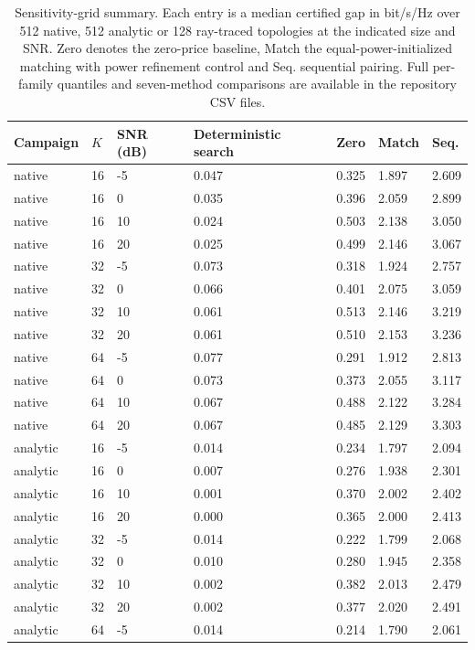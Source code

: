 \begin{table}[htbp]\centering\small
\setlength{\tabcolsep}{3pt}
\caption{Sensitivity-grid summary. Each entry is a median certified gap in bit/s/Hz over 512 native, 512 analytic or 128 ray-traced topologies at the indicated size and SNR. Zero denotes the zero-price baseline, Match the equal-power-initialized matching with power refinement control and Seq. sequential pairing. Full per-family quantiles and seven-method comparisons are available in the repository CSV files.}\label{supp:table5}
\begin{tabular}{lllllll}\toprule
Campaign & $K$ & SNR (dB) & Deterministic search & Zero & Match & Seq.\\\midrule
native & 16 & -5 & 0.047 & 0.325 & 1.897 & 2.609\\
native & 16 & 0 & 0.035 & 0.396 & 2.059 & 2.899\\
native & 16 & 10 & 0.024 & 0.503 & 2.138 & 3.050\\
native & 16 & 20 & 0.025 & 0.499 & 2.146 & 3.067\\
native & 32 & -5 & 0.073 & 0.318 & 1.924 & 2.757\\
native & 32 & 0 & 0.066 & 0.401 & 2.075 & 3.059\\
native & 32 & 10 & 0.061 & 0.513 & 2.146 & 3.219\\
native & 32 & 20 & 0.061 & 0.510 & 2.153 & 3.236\\
native & 64 & -5 & 0.077 & 0.291 & 1.912 & 2.813\\
native & 64 & 0 & 0.073 & 0.373 & 2.055 & 3.117\\
native & 64 & 10 & 0.067 & 0.488 & 2.122 & 3.284\\
native & 64 & 20 & 0.067 & 0.485 & 2.129 & 3.303\\
analytic & 16 & -5 & 0.014 & 0.234 & 1.797 & 2.094\\
analytic & 16 & 0 & 0.007 & 0.276 & 1.938 & 2.301\\
analytic & 16 & 10 & 0.001 & 0.370 & 2.002 & 2.402\\
analytic & 16 & 20 & 0.000 & 0.365 & 2.000 & 2.413\\
analytic & 32 & -5 & 0.014 & 0.222 & 1.799 & 2.068\\
analytic & 32 & 0 & 0.010 & 0.280 & 1.945 & 2.358\\
analytic & 32 & 10 & 0.002 & 0.382 & 2.013 & 2.479\\
analytic & 32 & 20 & 0.002 & 0.377 & 2.020 & 2.491\\
analytic & 64 & -5 & 0.014 & 0.214 & 1.790 & 2.061\\

\end{tabular}
\end{table}

